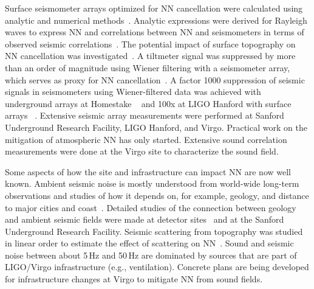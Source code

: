 Surface seismometer arrays optimized for \ac{NN} cancellation were calculated using analytic and numerical methods~\cite{Har2015,CoEA2016a}. Analytic expressions were derived for Rayleigh waves to express \ac{NN} and correlations between \ac{NN} and seismometers in terms of observed seismic correlations~\cite{Har2015,CoEA2016a}. The potential impact of surface topography on \ac{NN} cancellation was investigated~\cite{CoHa2012}. A tiltmeter signal was suppressed by more than an order of magnitude using Wiener filtering with a seismometer array, which serves as proxy for \ac{NN} cancellation~\cite{HaVe2016,CoEA2018}. A factor 1000 suppression of seismic signals in seismometers using Wiener-filtered data was achieved with underground arrays at Homestake ~\cite{CoEA2014} and 100x at \ac{LIGO} Hanford with surface arrays ~\cite{CoEA2018}. Extensive seismic array measurements were performed at Sanford Underground Research Facility, \ac{LIGO} Hanford, and Virgo. Practical work on the mitigation of atmospheric \ac{NN} has only started. Extensive sound correlation measurements were done at the Virgo site to characterize the sound field.

Some aspects of how the site and infrastructure can impact \ac{NN} are now well known. 
Ambient seismic noise is mostly understood from world-wide long-term observations and studies of how it depends on, for example, geology, and distance to major cities and coast~\cite{CoHa2012b}. Detailed studies of the connection between geology and ambient seismic fields were made at detector sites~\cite{HaOR2011} and at the Sanford Underground Research Facility. Seismic scattering from topography was studied in linear order to estimate the effect of scattering on \ac{NN}~\cite{CoHa2012}. Sound and seismic noise between about 5\,Hz and 50\,Hz are dominated by sources that are part of \ac{LIGO}/Virgo infrastructure (e.g., ventilation). Concrete plans are being developed for infrastructure changes at Virgo to mitigate \ac{NN} from sound fields.

